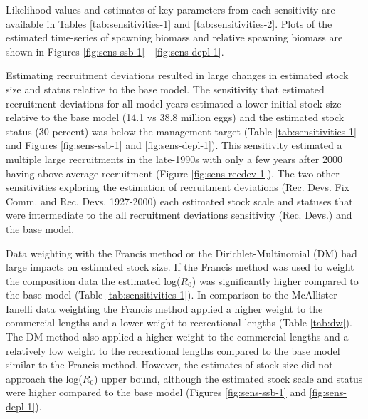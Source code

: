 \documentclass[11pt,
  english,
  a4paper,
]{article}
\begin{document}

Likelihood values and estimates of key parameters from each sensitivity are available in Tables \ref{tab:sensitivities-1} and \ref{tab:sensitivities-2}. Plots of the estimated time-series of spawning biomass and relative spawning biomass are shown in Figures \ref{fig:sens-ssb-1} - \ref{fig:sens-depl-1}.

\leavevmode\tagmcend\tagstructend\par


Estimating recruitment deviations resulted in large changes in estimated stock size and status relative to the base model. The sensitivity that estimated recruitment deviations for all model years estimated a lower initial stock size relative to the base model (14.1 vs 38.8 million eggs) and the estimated stock status (30 percent) was below the management target (Table \ref{tab:sensitivities-1} and Figures \ref{fig:sens-ssb-1} and \ref{fig:sens-depl-1}). This sensitivity estimated a multiple large recruitments in the late-1990s with only a few years after 2000 having above average recruitment (Figure \ref{fig:sens-recdev-1}). The two other sensitivities exploring the estimation of recruitment deviations (Rec. Devs. Fix Comm. and Rec. Devs. 1927-2000) each estimated stock scale and statuses that were intermediate to the all recruitment deviations sensitivity (Rec. Devs.) and the base model.

\leavevmode\tagmcend\tagstructend\par


Data weighting with the Francis method or the Dirichlet-Multinomial (DM) had large impacts on estimated stock size. If the Francis method was used to weight the composition data the estimated log({\(R_0\)\leavevmode\tagmcend\tagstructend}) was significantly higher compared to the base model (Table \ref{tab:sensitivities-1}). In comparison to the McAllister-Ianelli data weighting the Francis method applied a higher weight to the commercial lengths and a lower weight to recreational lengths (Table \ref{tab:dw}). The DM method also applied a higher weight to the commercial lengths and a relatively low weight to the recreational lengths compared to the base model similar to the Francis method. However, the estimates of stock size did not approach the log({\(R_0\)\leavevmode\tagmcend\tagstructend}) upper bound, although the estimated stock scale and status were higher compared to the base model (Figures \ref{fig:sens-ssb-1} and \ref{fig:sens-depl-1}).
\end{document}
